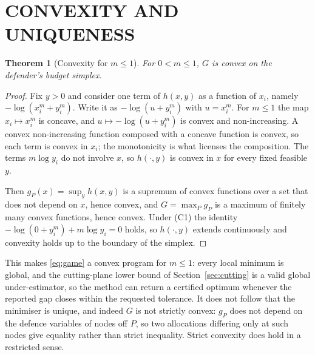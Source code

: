 \documentclass[10pt,a4paper,twoside]{article}
\theoremstyle{plain}
\newtheorem{theorem}{Theorem}
\theoremstyle{definition}
\begin{document}
\section{CONVEXITY AND UNIQUENESS}
\label{sec:convexity}

\begin{theorem}[Convexity for $m\le1$]
\label{thm:convexity}
For $0<m\le1$, $G$ is convex on the defender's budget simplex.
\end{theorem}
\begin{proof}
Fix $y>0$ and consider one term of $h(x,y)$ as a function of $x_i$, namely
$-\log(x_i^m+y_i^m)$. Write it as $-\log(u+y_i^m)$ with $u=x_i^m$. For
$m\le1$ the map $x_i\mapsto x_i^m$ is concave, and $u\mapsto-\log(u+y_i^m)$
is convex and non-increasing. A convex non-increasing function composed with
a concave function is convex, so each term is convex in $x_i$; the monotonicity
is what licenses the composition. The terms $m\log y_i$ do not involve $x$,
so $h(\cdot,y)$ is convex in $x$ for every fixed feasible $y$.

Then $g_P(x)=\sup_y h(x,y)$ is a supremum of convex functions over a set that
does not depend on $x$, hence convex, and $G=\max_P g_P$ is a maximum of
finitely many convex functions, hence convex. Under (C1) the identity
$-\log(0+y_i^m)+m\log y_i=0$ holds, so $h(\cdot,y)$ extends continuously and
convexity holds up to the boundary of the simplex.
\end{proof}

This makes \eqref{eq:game} a convex program for $m\le1$: every local minimum
is global, and the cutting-plane lower bound of Section~\ref{sec:cutting} is
a valid global under-estimator, so the method can return a certified optimum
whenever the reported gap closes within the requested tolerance. It does not
follow that the minimiser is unique, and indeed $G$ is not strictly convex:
$g_P$ does not depend on the defence variables of nodes off $P$, so two
allocations differing only at such nodes give equality rather than strict
inequality. Strict convexity does hold in a restricted sense.
\end{document}
